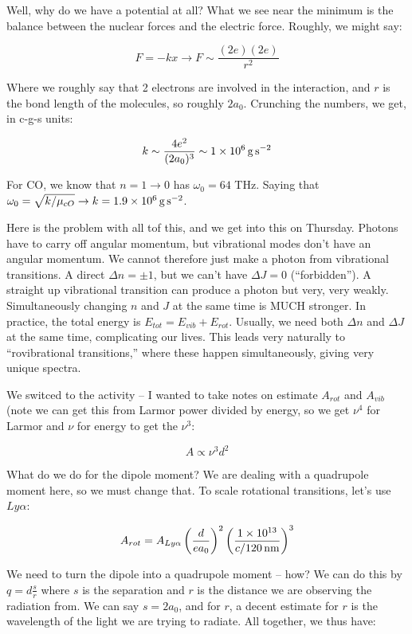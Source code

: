 \documentclass{article}
\newcommand{\unit}[1]{{\,\rm #1}}
\newcommand{\be}{\begin{equation}}
\newcommand{\ee}{\end{equation}}
\def\lya{{Ly\alpha}}
\newcommand{\s}{\unit{s}}
\newcommand{\g}{\unit{g}}
\newcommand{\nm}{\unit{nm}}
\begin{document}
Well, why do we have a potential at all? What we see near the minimum is the balance between the nuclear forces and the electric force. Roughly, we might say:

\be
 F = -k x \rightarrow F \sim \frac{(2e)(2e)}{r^2}
\ee

Where we roughly say that 2 electrons are involved in the interaction, and $r$ is the bond length of the molecules, so roughly $2 a_0$. Crunching the numbers, we get, in c-g-s units:

\be
k \sim \frac{4e^2}{(2 a_0)^3} \sim 1 \times 10^{6} \g \s^{-2}
\ee

For CO, we know that $n=1\rightarrow0$ has $\omega_0 = 64$ THz. Saying that $\omega_0 = \sqrt{k/\mu_{cO}} \rightarrow k = 1.9 \times10^{6} \g \s^{-2}$.

Here is the problem with all tof this, and we get into this on Thursday. Photons have to carry off angular momentum, but vibrational modes don't have an angular momentum. We cannot therefore just make a photon from vibrational transitions. A direct $\Delta n = \pm 1$, but we can't have $\Delta J = 0$ (``forbidden''). A straight up vibrational transition can produce a photon but very, very weakly. Simultaneously changing $n$ and $J$ at the same time is MUCH stronger. In practice, the total energy is $E_{tot} = E_{vib} + E_{rot}$. Usually, we need both $\Delta n$ and $\Delta J$ at the same time, complicating our lives. This leads very naturally to ``rovibrational transitions,'' where these happen simultaneously, giving very unique spectra. 

We switced to the activity -- I wanted to take notes on estimate $A_{rot}$ and $A_{vib}$ (note we can get this from Larmor power divided by energy, so we get $\nu^4$ for Larmor and $\nu$ for energy to get the $\nu^3$:

\be
A \propto \nu^3 d^2
\ee

What do we do for the dipole moment? We are dealing with a quadrupole moment here, so we must change that. To scale rotational transitions, let's use $\lya$:

\be
A_{rot} = A_\lya \left(\frac{d}{e a_0}\right)^2 \left(\frac{1\times 10^{13}}{c/120 \nm}\right)^3
\ee

We need to turn the dipole into a quadrupole moment -- how? We can do this by $q = d \frac{s}{r}$ where $s$ is the separation and $r$ is the distance we are observing the radiation from. We can say $s = 2 a_0$, and for $r$, a decent estimate for $r$ is the wavelength of the light we are trying to radiate. All together, we thus have:
\end{document}
